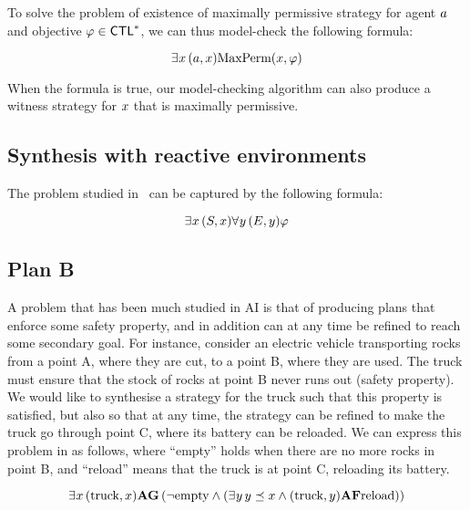 To solve the problem of existence of maximally permissive strategy for
agent $\ag$ and objective $\phi\in\CTLs$,  we can thus model-check the
following \SLref formula:

\[\Estratnd (\ag,\var) \maxperm(\var,\phi)\]

When the formula is true, our model-checking algorithm can also
produce a witness strategy for $\var$ that is maximally permissive.


\subsection{Synthesis with reactive environments}
\label{sec-synth-open-env}

The problem studied in~\cite{kupferman2000open} can be captured by the
following formula:

\[\Estratnd (S,\var) \Astratnd[\varb] (E,\varb) \phi\]

\subsection{Plan B}
\label{sec-plan-B}

A problem that has been much studied in AI  is
that of producing plans that enforce some safety property, and in addition
can at any time be refined to reach some secondary goal. For instance,
consider an electric vehicle transporting rocks from a point A, where
they are cut, to a point B, where they are used. The truck must ensure
that the stock of rocks at point B never runs out (safety property). We would like to synthesise a
strategy for the truck such that  this property is satisfied, but also
so that at any time, the strategy can be refined to make the truck go
through point C, where its battery can be reloaded.
We can express  this problem in \SLref as follows, where ``empty''
holds when there are no more rocks in point B, and ``reload'' means
that the truck is at point C, reloading its battery.

\[\Estratnd (\text{truck},\var) \A \always \left ( \neg \text{empty} \wedge
  (\Estratnd[\varb] \varb\refines\var \wedge (\text{truck},\varb)\A\F \text{reload}) \right )\]

